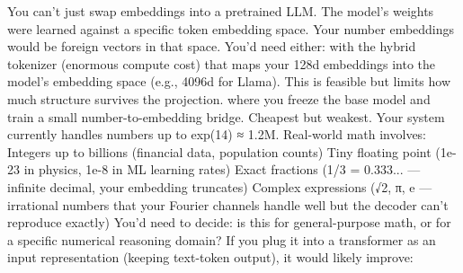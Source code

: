 {}
\markdownRendererSectionEnd \markdownRendererSectionBegin
{}\markdownRendererInterblockSeparator
{}You can't just swap embeddings into a pretrained LLM. The model's weights were learned against a specific token embedding space. Your number embeddings would be foreign vectors in that space. You'd need either:\markdownRendererInterblockSeparator
{}\markdownRendererUlBeginTight
\markdownRendererUlItem {} with the hybrid tokenizer (enormous compute cost)\markdownRendererUlItemEnd 
\markdownRendererUlItem {} that maps your 128d embeddings into the model's embedding space (e.g., 4096d for Llama). This is feasible but limits how much structure survives the projection.\markdownRendererUlItemEnd 
\markdownRendererUlItem {} where you freeze the base model and train a small number-to-embedding bridge. Cheapest but weakest.\markdownRendererUlItemEnd 
\markdownRendererUlEndTight \markdownRendererInterblockSeparator
{}
\markdownRendererSectionEnd \markdownRendererSectionBegin
{}\markdownRendererInterblockSeparator
{}Your system currently handles numbers up to \markdownRendererTilde{}exp(14) ≈ 1.2M. Real-world math involves:\markdownRendererInterblockSeparator
{}\markdownRendererUlBeginTight
\markdownRendererUlItem Integers up to billions (financial data, population counts)\markdownRendererUlItemEnd 
\markdownRendererUlItem Tiny floating point (1e-23 in physics, 1e-8 in ML learning rates)\markdownRendererUlItemEnd 
\markdownRendererUlItem Exact fractions (1/3 = 0.333... — infinite decimal, your embedding truncates)\markdownRendererUlItemEnd 
\markdownRendererUlItem Complex expressions (√2, π, e — irrational numbers that your Fourier channels handle well but the decoder can't reproduce exactly)\markdownRendererUlItemEnd 
\markdownRendererUlEndTight \markdownRendererInterblockSeparator
{}You'd need to decide: is this for general-purpose math, or for a specific numerical reasoning domain?\markdownRendererInterblockSeparator
{}
\markdownRendererSectionEnd 
\markdownRendererSectionEnd \markdownRendererSectionBegin
{}\markdownRendererInterblockSeparator
{} If you plug it into a transformer as an input representation (keeping text-token output), it would likely improve:\markdownRendererInterblockSeparator

